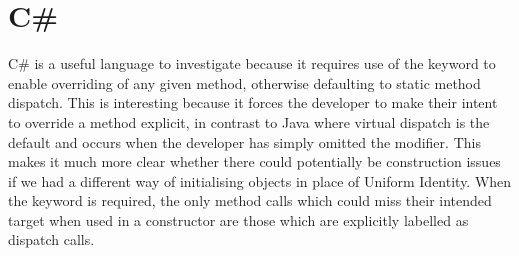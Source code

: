 \section{C\#}
C\# is a useful language to investigate because it requires use of the  keyword to enable overriding of any given method, otherwise defaulting to static method dispatch. This is interesting because it forces the developer to make their intent to override a method explicit, in contrast to Java where virtual dispatch is the default and occurs when the developer has simply omitted the  modifier. This makes it much more clear whether there could potentially be construction issues if we had a different way of initialising objects in place of Uniform Identity. When the  keyword is required, the only method calls which could miss their intended target when used in a constructor are those which are explicitly labelled as  dispatch calls.

